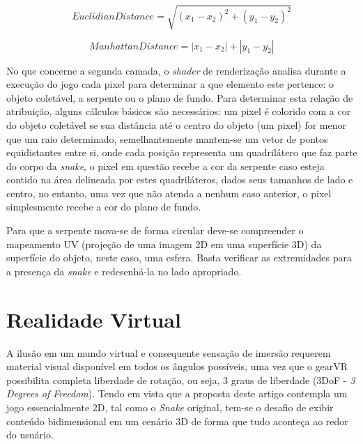 \documentclass[conference]{IEEEtran}
\begin{document}
\begin{equation}
EuclidianDistance = \sqrt{(x_{1} - x_{2})^2 + (y_{1} - y_{2})^2}
\label{equation:euclidian}
\end{equation}

\begin{equation}
ManhattanDistance = \left|x_{1} - x_{2}\right| + \left|y_{1} - y_{2}\right|
\label{equation:manhattan}
\end{equation}

No que concerne a segunda camada, o \textit{shader} de renderização analisa durante a execução do jogo cada pixel para determinar a que elemento este pertence: o objeto coletável, a serpente ou o plano de fundo. Para determinar esta relação de atribuição, alguns cálculos básicos são necessários: um pixel é colorido com a cor do objeto coletável se sua distância até o centro do objeto (um pixel) for menor que um raio determinado, semelhantemente mantem-se um vetor de pontos equidistantes entre si, onde cada posição representa um quadrilátero que faz parte do corpo da \textit{snake}, o pixel em questão recebe a cor da serpente caso esteja contido na área delineada por estes quadriláteros, dados seus tamanhos de lado e centro, no entanto, uma vez que não atenda a nenhum caso anterior, o pixel simplesmente recebe a cor do plano de fundo.

Para que a serpente mova-se de forma circular deve-se compreender o mapeamento UV (projeção de uma imagem 2D em uma superfície 3D) da superfície do objeto, neste caso, uma esfera. Basta verificar as extremidades para a presença da \textit{snake} e redesenhá-la no lado apropriado.

\section{Realidade Virtual}

A ilusão em um mundo virtual e consequente sensação de imersão requerem material visual disponível em todos os ângulos possíveis, uma vez que o gearVR possibilita completa liberdade de rotação, ou seja, 3 graus de liberdade (3DoF - \textit{3 Degrees of Freedom}). Tendo em vista que a proposta deste artigo contempla um jogo essencialmente 2D, tal como o \textit{Snake} original, tem-se o desafio de exibir conteúdo bidimensional em um cenário 3D de forma que tudo aconteça ao redor do usuário.
\end{document}
